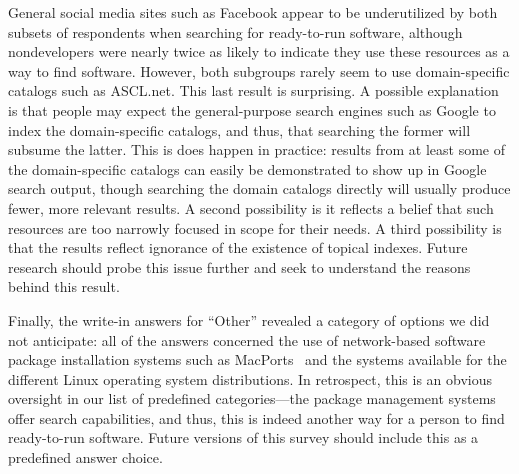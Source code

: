 \documentclass{casicswhitepaper}
\begin{document}

General social media sites such as Facebook appear to be underutilized by both subsets of respondents when searching for ready-to-run software, although nondevelopers were nearly twice as likely to indicate they use these resources as a way to find software.  However, both subgroups rarely seem to use domain-specific catalogs such as ASCL.net.  This last result is surprising.  A possible explanation is that people may expect the general-purpose search engines such as Google to index the domain-specific catalogs, and thus, that searching the former will subsume the latter.  This is does happen in practice: results from at least some of the domain-specific catalogs can easily be demonstrated to show up in Google search output, though searching the domain catalogs directly will usually produce fewer, more relevant results.  A second possibility is it reflects a belief that such resources are too narrowly focused in scope for their needs.  A third possibility is that the results reflect ignorance of the existence of topical indexes.  Future research should probe this issue further and seek to understand the reasons behind this result.

Finally, the write-in answers for ``Other'' revealed a category of options we did not anticipate: all of the answers concerned the use of network-based software package installation systems such as MacPorts~\cite{fuller2002macports} and the systems available for the different Linux operating system distributions.  In retrospect, this is an obvious oversight in our list of predefined categories---the package management systems offer search capabilities, and thus, this is indeed another way for a person to find ready-to-run software.  Future versions of this survey should include this as a predefined answer choice.
\end{document}
